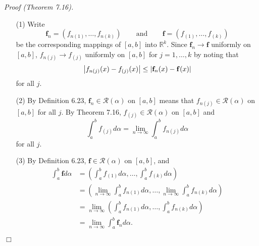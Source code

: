 \documentclass{article}
\begin{document}
\emph{Proof (Theorem 7.16).}
\begin{enumerate}
\item[(1)]
  Write
  \[
    \mathbf{f}_n = \left(f_{n(1)}, \ldots, f_{n(k)}\right)
    \:\:\:\:\:\:\:\:
    \text{ and }
    \:\:\:\:\:\:\:\:
    \mathbf{f} = \left(f_{(1)}, \ldots, f_{(k)}\right)
  \]
  be the corresponding mappings of $[a,b]$ into $\mathbb{R}^k$.
  Since $\mathbf{f}_n \to \mathbf{f}$ uniformly on $[a,b]$,
  $f_{n(j)} \to f_{(j)}$ uniformly on $[a,b]$ for $j = 1,\ldots,k$
  by noting that
  \[
    \abs{ f_{n(j)}(x) - f_{(j)}(x) }
    \leq
    \abs{ \mathbf{f}_n(x) - \mathbf{f}(x) }
  \]
  for all $j$.

\item[(2)]
  By Definition 6.23,
  $\mathbf{f}_n \in \mathscr{R}(\alpha)$ on $[a,b]$
  means that
  $f_{n(j)} \in \mathscr{R}(\alpha)$ on $[a,b]$ for all $j$.
  By Theorem 7.16, $f_{(j)} \in \mathscr{R}(\alpha)$ on $[a,b]$ and
  \[
    \int_{a}^{b} f_{(j)} d\alpha
    = \lim_{n \to \infty} \int_{a}^{b} f_{n(j)} d\alpha
  \]
  for all $j$.

\item[(3)]
  By Definition 6.23, $\mathbf{f} \in \mathscr{R}(\alpha)$ on $[a,b]$, and
  \begin{align*}
    \int_{a}^{b} \mathbf{f} d\alpha
    &= \left(
        \int_{a}^{b} f_{(1)} d\alpha,
        \ldots,
        \int_{a}^{b} f_{(k)} d\alpha
      \right) \\
    &= \left(
        \lim_{n \to \infty} \int_{a}^{b} f_{n(1)} d\alpha,
        \ldots,
        \lim_{n \to \infty} \int_{a}^{b} f_{n(k)} d\alpha
      \right) \\
    &= \lim_{n \to \infty} \left(
        \int_{a}^{b} f_{n(1)} d\alpha,
        \ldots,
        \int_{a}^{b} f_{n(k)} d\alpha
      \right) \\
    &= \lim_{n \to \infty} \int_{a}^{b} \mathbf{f}_n d\alpha.
  \end{align*}
\end{enumerate}
$\Box$ \\
\end{document}
